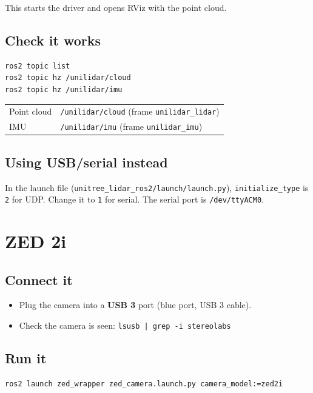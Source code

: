 \documentclass[11pt,a4paper]{article}
\begin{document}
This starts the driver and opens RViz with the point cloud.

\subsection{Check it works}

\begin{lstlisting}[language=bash]
ros2 topic list
ros2 topic hz /unilidar/cloud
ros2 topic hz /unilidar/imu
\end{lstlisting}

\begin{tabular}{ll}
  Point cloud & \texttt{/unilidar/cloud} (frame \texttt{unilidar\_lidar}) \\
  IMU         & \texttt{/unilidar/imu} (frame \texttt{unilidar\_imu}) \\
\end{tabular}

\subsection{Using USB/serial instead}

In the launch file (\texttt{unitree\_lidar\_ros2/launch/launch.py}), \texttt{initialize\_type} is \texttt{2} for UDP. Change it to \texttt{1} for serial. The serial port is \texttt{/dev/ttyACM0}.

\section{ZED 2i}

\subsection{Connect it}

\begin{itemize}
  \item Plug the camera into a \textbf{USB 3} port (blue port, USB 3 cable).
  \item Check the camera is seen: \texttt{lsusb | grep -i stereolabs}
\end{itemize}

\subsection{Run it}

\begin{lstlisting}[language=bash]
ros2 launch zed_wrapper zed_camera.launch.py camera_model:=zed2i
\end{lstlisting}
\end{document}
